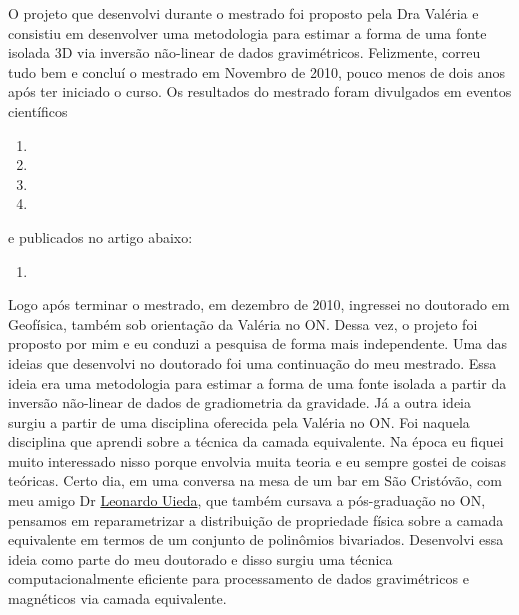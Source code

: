 O projeto que desenvolvi durante o mestrado foi proposto pela Dra Valéria e consistiu
em desenvolver uma metodologia para estimar a forma de uma fonte isolada 3D via inversão
não-linear de dados gravimétricos. Felizmente, correu tudo bem e concluí o mestrado 
em Novembro de 2010, pouco menos de dois anos após ter iniciado o curso.
Os resultados do mestrado foram divulgados em eventos científicos
\begin{enumerate}
	\item {}
	\item {}
	\item {}
	\item {}
\end{enumerate}
\noindent e publicados no artigo abaixo:
\begin{enumerate}
	\item {} 
\end{enumerate}

Logo após terminar o mestrado, em dezembro de 2010, ingressei no doutorado em Geofísica,
também sob orientação da Valéria no ON. Dessa vez, o projeto foi proposto por mim
e eu conduzi a pesquisa de forma mais independente. Uma das ideias que desenvolvi no 
doutorado foi uma continuação do meu mestrado. Essa ideia era uma metodologia para
estimar a forma de uma fonte isolada a partir da inversão não-linear de dados de 
gradiometria da gravidade. Já a outra ideia surgiu a partir de uma disciplina oferecida
pela Valéria no ON. Foi naquela disciplina que aprendi sobre a técnica da camada 
equivalente. Na época eu fiquei muito interessado nisso porque envolvia muita teoria e eu
sempre gostei de coisas teóricas.
Certo dia, em uma conversa na mesa de um bar em São Cristóvão, com meu amigo Dr
\href{https://www.leouieda.com/}{Leonardo Uieda}, que também cursava a pós-graduação no ON, pensamos em reparametrizar a
distribuição de propriedade física sobre a camada equivalente em termos de um conjunto de
polinômios bivariados. Desenvolvi essa ideia como parte do meu doutorado e disso 
surgiu uma técnica computacionalmente eficiente para processamento de dados gravimétricos
e magnéticos via camada equivalente.


